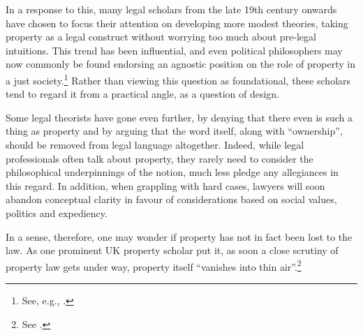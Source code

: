 \documentclass{article} %
\begin{document}
In a response to this, many legal scholars from the late 19th century onwards have chosen to focus their attention on developing more modest theories, taking property as a legal construct without worrying too much about pre-legal intuitions. This trend has been influential, and even political philosophers may now commonly be found endorsing an agnostic position on the role of property in a just society.\footnote{See, e.g., \cite[274]{rawls71}.} Rather than viewing this question as foundational, these scholars tend to regard it from a practical angle, as a question of design.

Some legal theorists have gone even further, by denying that there even is such a thing as property and by arguing that the word itself, along with ``ownership'', should be removed from legal language altogether. Indeed, while legal professionals often talk about property, they rarely need to consider the philosophical underpinnings of the notion, much less pledge any allegiances in this regard. In addition, when grappling with hard cases, lawyers will soon abandon conceptual clarity in favour of considerations based on social values, politics and expediency.

In a sense, therefore, one may wonder if property has not in fact been lost to the law. As one prominent UK property scholar put it, as soon a close scrutiny of property law gets under way, property itself ``vanishes into thin air''.\footnote{See \cite[306-307]{gray91}.}
\end{document}
